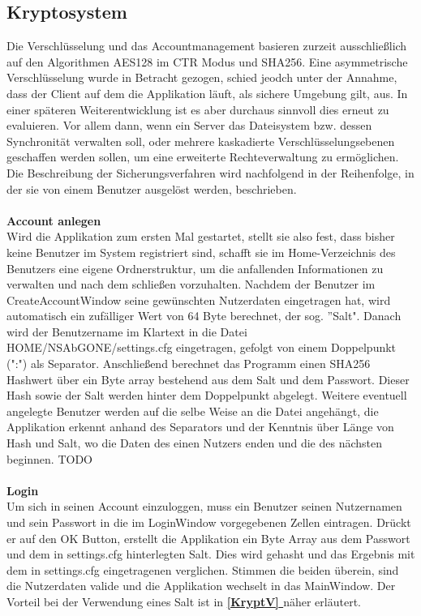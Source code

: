 \documentclass[12pt,a4paper,bibliography=totocnumbered,listof=totocnumbered]{scrartcl}
\newcommand*{\fullref}[1]{\textbf{\hyperref[{#1}]{\ref*{#1} \nameref*{#1}}}}
\begin{document}
\subsection{Kryptosystem}
Die Verschlüsselung und das Accountmanagement basieren zurzeit ausschließlich auf den Algorithmen AES128 im CTR Modus und SHA256. Eine asymmetrische Verschlüsselung wurde in Betracht gezogen, schied jeodch unter der Annahme, dass der Client auf dem die Applikation läuft, als sichere Umgebung gilt, aus. In einer späteren Weiterentwicklung ist es aber durchaus sinnvoll dies erneut zu evaluieren. Vor allem dann, wenn ein Server das Dateisystem bzw. dessen Synchronität verwalten soll, oder mehrere kaskadierte Verschlüsselungsebenen geschaffen werden sollen, um eine erweiterte Rechteverwaltung zu ermöglichen. Die Beschreibung der Sicherungsverfahren wird nachfolgend in der Reihenfolge, in der sie von einem Benutzer ausgelöst werden, beschrieben.
\\\\\textbf{Account anlegen}\\
Wird die Applikation zum ersten Mal gestartet, stellt sie also fest, dass bisher keine Benutzer im System registriert sind, schafft sie im Home-Verzeichnis des Benutzers eine eigene Ordnerstruktur, um die anfallenden Informationen zu verwalten und nach dem schließen vorzuhalten. Nachdem der Benutzer im CreateAccountWindow seine gewünschten Nutzerdaten eingetragen hat, wird automatisch ein zufälliger Wert von 64 Byte berechnet, der sog. ''Salt". Danach wird der Benutzername im Klartext in die Datei HOME/NSAbGONE/settings.cfg eingetragen, gefolgt von einem Doppelpunkt (":") als Separator. Anschließend berechnet das Programm einen SHA256 Hashwert über ein Byte array bestehend aus dem Salt und dem Passwort. Dieser Hash sowie der Salt werden hinter dem Doppelpunkt abgelegt. Weitere eventuell angelegte Benutzer werden auf die selbe Weise an die Datei angehängt, die Applikation erkennt anhand des Separators und der Kenntnis über Länge von Hash und Salt, wo die Daten des einen Nutzers enden und die des nächsten beginnen. TODO
\\\\\textbf{Login}\\
Um sich in seinen Account einzuloggen, muss ein Benutzer seinen Nutzernamen und sein Passwort in die im LoginWindow vorgegebenen Zellen eintragen. Drückt er auf den OK Button, erstellt die Applikation ein Byte Array aus dem Passwort und dem in settings.cfg hinterlegten Salt. Dies wird gehasht und das Ergebnis mit dem in settings.cfg eingetragenen verglichen. Stimmen die beiden überein, sind die Nutzerdaten valide und die Applikation wechselt in das MainWindow. Der Vorteil bei der Verwendung eines Salt ist in \fullref{KryptV} näher erläutert.
\end{document}

